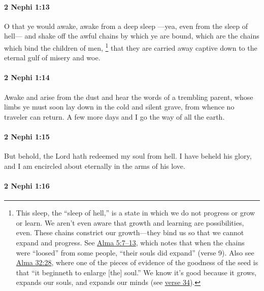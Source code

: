 		\paragraph{2 Nephi 1:13} %
			\label{2NEPHI-1-13}

			O that ye would awake, awake from a deep sleep
			---yea, even from the sleep of hell---
			and shake off the awful chains by which ye are bound,
			which are the chains which bind the children of men,%
				\footnote{%
					\label{2NEPHI-1-13-chains}%
					This sleep, the ``sleep of hell,'' is a state in which we do not progress or grow or learn. We aren't even aware that growth and learning are possibilities, even. These chains constrict our growth---they bind us so that we cannot expand and progress. See \hyperref[ALMA-5-7]{Alma 5:7--13}, which notes that when the chains were ``loosed'' from some people, ``their souls did expand'' (verse 9). Also see \hyperref[ALMA-32-28]{Alma 32:28}, where one of the pieces of evidence of the goodness of the seed is that ``it beginneth to enlarge [the] soul.'' We know it's good because it grows, expands our souls, and expands our minds (see \hyperref[ALMA-32-34]{verse 34}).
					}
			that they are carried away captive down to the eternal gulf of misery and woe.

		\paragraph{2 Nephi 1:14} %
			\label{2NEPHI-1-14}

			Awake and arise from the dust
			and hear the words of a trembling parent,
			whose limbs ye must soon lay down in the cold and silent grave,
			from whence no traveler can return.
			A few more days and I go the way of all the earth.

		\paragraph{2 Nephi 1:15} %
			\label{2NEPHI-1-15}

			But behold, the Lord hath redeemed my soul from hell.
			I have beheld his glory,
			and I am encircled about eternally in the arms of his love.

		\paragraph{2 Nephi 1:16} %
			\label{2NEPHI-1-16}

